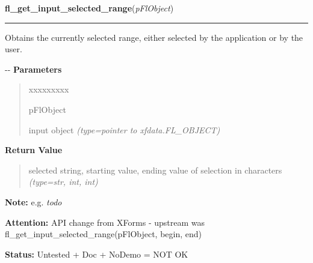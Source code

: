 \hspace{.8\funcindent}\begin{boxedminipage}{\funcwidth}

    \raggedright \textbf{fl\_get\_input\_selected\_range}(\textit{pFlObject})

    \vspace{-1.5ex}

    \rule{\textwidth}{0.5\fboxrule}
\setlength{\parskip}{2ex}

Obtains the currently selected range, either selected by the
application or by the user.

-{}-
\setlength{\parskip}{1ex}
      \textbf{Parameters}
      \vspace{-1ex}

      \begin{quote}
        \begin{Ventry}{xxxxxxxxx}

          \item[pFlObject]


input object
            {\it (type=pointer to xfdata.FL\_OBJECT)}

        \end{Ventry}

      \end{quote}

      \textbf{Return Value}
    \vspace{-1ex}

      \begin{quote}

selected string, starting value, ending value of selection
in characters
      {\it (type=str, int, int)}

      \end{quote}

\textbf{Note:} 
e.g. \emph{todo}


\textbf{Attention:} 
API change from XForms - upstream was
fl\_get\_input\_selected\_range(pFlObject, begin, end)


\textbf{Status:} 
Untested + Doc + NoDemo = NOT OK


    \end{boxedminipage}

    \label{xformslib:flinput:fl_set_input_maxchars}

    \vspace{0.5ex}

